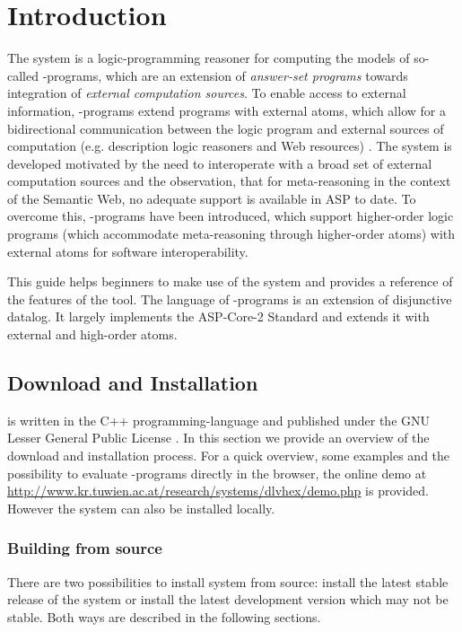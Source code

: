 \documentclass[a4paper, titlepage]{article}
\begin{document}
\section{Introduction} %
\label{sec:intro}
The \dlvhex{} system is a logic-programming reasoner for 
computing the models of so-called \hex{}-programs, which 
are an extension of \emph{answer-set programs} towards 
integration of \emph{external computation sources}. To 
enable access to external information, \hex{}-programs 
extend programs with external atoms, which allow for a 
bidirectional communication between the logic program and 
external sources of computation (e.g. description logic 
reasoners and Web resources) \cite{efkr2012}. The system is 
developed motivated by the need to interoperate with a 
broad set of external computation sources and the 
observation, that for meta-reasoning in the context of the 
Semantic Web, no adequate support is available in ASP to 
date. To overcome this, \hex{}-programs have been 
introduced, which support higher-order logic programs 
(which accommodate meta-reasoning through higher-order 
atoms) with external atoms for software interoperability.

This guide helps beginners to make use of the system and 
provides a reference of the features of the tool. The language of \hex{}-programs is an extension of disjunctive datalog. It largely 
implements the ASP-Core-2 Standard \cite{cffiklrs2013} and 
extends it with external and high-order atoms. 


\subsection{Download and Installation}
\dlvhex{} is written in the C++ programming-language
and published under the GNU Lesser General 
Public License \cite{licnc}. 
In this section we provide an overview of the 
download and installation process. For a quick overview, 
some examples and the possibility to evaluate 
\hex{}-programs directly in the browser, the online demo at 
\url{http://www.kr.tuwien.ac.at/research/systems/dlvhex/demo.php} 
is provided. However the system can also be installed 
locally. 

\subsubsection{Building from source}
There are two possibilities to install \dlvhex{} system 
from source: install the latest stable release of the 
system or install the latest development version which may 
not be stable. Both ways are described in the following 
sections.  
\end{document}
